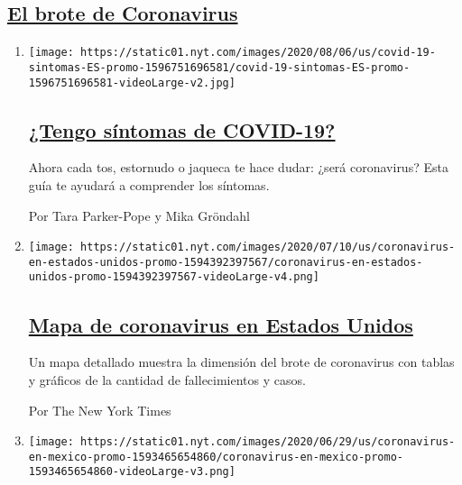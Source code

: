 \hypertarget{el-brote-de-coronavirus}{%
\subsection{\texorpdfstring{\protect\hyperlink{}{El brote de
Coronavirus}}{El brote de Coronavirus}}\label{el-brote-de-coronavirus}}

\begin{enumerate}
\def\labelenumi{\arabic{enumi}.}
\item
  \texttt{[image: https://static01.nyt.com/images/2020/08/06/us/covid-19-sintomas-ES-promo-1596751696581/covid-19-sintomas-ES-promo-1596751696581-videoLarge-v2.jpg]}

  \hypertarget{tengo-suxedntomas-de-covid-19}{%
  \subsection{\texorpdfstring{\href{/es/interactive/2020/08/06/espanol/ciencia-y-tecnologia/tengo-covid-19-sintomas.html}{¿Tengo
  síntomas de
  COVID-19?}}{¿Tengo síntomas de COVID-19?}}\label{tengo-suxedntomas-de-covid-19}}

  Ahora cada tos, estornudo o jaqueca te hace dudar: ¿será coronavirus?
  Esta guía te ayudará a comprender los síntomas.

  Por Tara Parker-Pope y Mika Gröndahl
\item
  \texttt{[image: https://static01.nyt.com/images/2020/07/10/us/coronavirus-en-estados-unidos-promo-1594392397567/coronavirus-en-estados-unidos-promo-1594392397567-videoLarge-v4.png]}

  \hypertarget{mapa-de-coronavirus-en-estados-unidos}{%
  \subsection{\texorpdfstring{\href{/es/interactive/2020/espanol/mundo/coronavirus-en-estados-unidos.html}{Mapa
  de coronavirus en Estados
  Unidos}}{Mapa de coronavirus en Estados Unidos}}\label{mapa-de-coronavirus-en-estados-unidos}}

  Un mapa detallado muestra la dimensión del brote de coronavirus con
  tablas y gráficos de la cantidad de fallecimientos y casos.

  Por The New York Times
\item
  \texttt{[image: https://static01.nyt.com/images/2020/06/29/us/coronavirus-en-mexico-promo-1593465654860/coronavirus-en-mexico-promo-1593465654860-videoLarge-v3.png]}


\end{enumerate}
